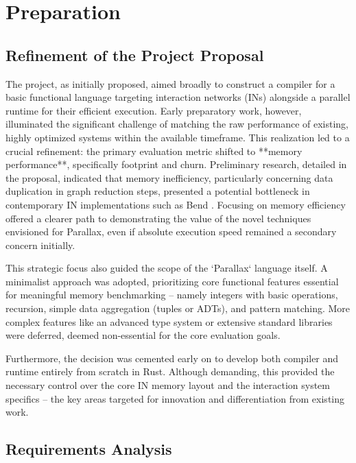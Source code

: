 \chapter{Preparation}

\section{Refinement of the Project Proposal} %

The project, as initially proposed, aimed broadly to construct a compiler for a basic functional language targeting interaction networks (INs) alongside a parallel runtime for their efficient execution. Early preparatory work, however, illuminated the significant challenge of matching the raw performance of existing, highly optimized systems within the available timeframe. This realization led to a crucial refinement: the primary evaluation metric shifted to **memory performance**, specifically footprint and churn. Preliminary research, detailed in the proposal, indicated that memory inefficiency, particularly concerning data duplication in graph reduction steps, presented a potential bottleneck in contemporary IN implementations such as Bend \cite{BendGithub}. Focusing on memory efficiency offered a clearer path to demonstrating the value of the novel techniques envisioned for Parallax, even if absolute execution speed remained a secondary concern initially.

This strategic focus also guided the scope of the `Parallax` language itself. A minimalist approach was adopted, prioritizing core functional features essential for meaningful memory benchmarking – namely integers with basic operations, recursion, simple data aggregation (tuples or ADTs), and pattern matching. More complex features like an advanced type system or extensive standard libraries were deferred, deemed non-essential for the core evaluation goals.

Furthermore, the decision was cemented early on to develop both compiler and runtime entirely from scratch in Rust. Although demanding, this provided the necessary control over the core IN memory layout and the interaction system specifics – the key areas targeted for innovation and differentiation from existing work.

\section{Requirements Analysis} %

